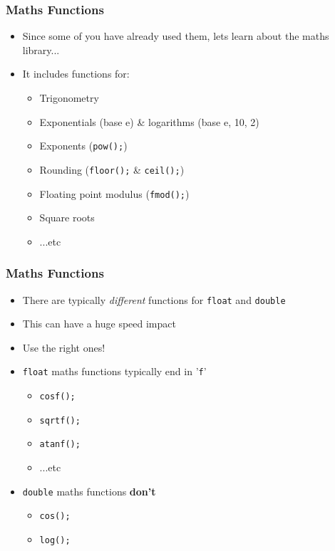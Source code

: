 \documentclass[14pt]{beamer}
\begin{document}
\begin{frame}
\frametitle{Maths Functions}
\begin{itemize}
\item Since some of you have already used them, lets learn about the maths library...
\item It includes functions for:
	\begin{itemize}
		\item Trigonometry
		\item Exponentials (base e) \& logarithms (base e, 10, 2)
		\item Exponents (\texttt{pow();})
		\item Rounding (\texttt{floor();} \& \texttt{ceil();})
		\item Floating point modulus (\texttt{fmod();})
		\item Square roots
		\item ...etc
	\end{itemize}
\end{itemize}
\end{frame}

\begin{frame}
\frametitle{Maths Functions}
\begin{itemize}
\item There are typically \textit{different} functions for \texttt{float} and \texttt{double}
\item This can have a huge speed impact
\item Use the right ones!
\item \texttt{float} maths functions typically end in '\texttt{f}'
	\begin{itemize}
		\item \texttt{cosf();}
		\item \texttt{sqrtf();}
		\item \texttt{atanf();}
		\item ...etc
	\end{itemize}
\item \texttt{double} maths functions \textbf{don't}
	\begin{itemize}
		\item \texttt{cos();}
		\item \texttt{log();}
	\end{itemize}
\end{itemize}
\end{frame}
\end{document}
